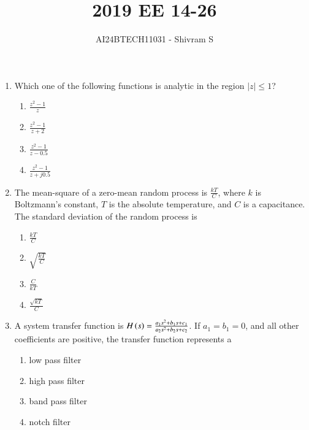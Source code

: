 \documentclass[journal]{IEEEtran}
\begin{document}

\onecolumn

\title{2019 EE 14-26}
\author{AI24BTECH11031 - Shivram S}
\maketitle
\bigskip

\renewcommand{\thefigure}{\theenumi}
\renewcommand{\thetable}{\theenumi}

\begin{enumerate}
    \item Which one of the following functions is analytic in the region $|z| \leq 1$?
    \begin{multicols}{4}
    \begin{enumerate}
        \item $\frac{z^2 - 1}{z}$
        \item $\frac{z^2 - 1}{z + 2}$
        \item $\frac{z^2 - 1}{z - 0.5}$
        \item $\frac{z^2 - 1}{z + j0.5}$
    \end{enumerate}
    \end{multicols}
    
    \item The mean-square of a zero-mean random process is $\frac{kT}{C}$, where $k$
    is Boltzmann’s constant, $T$ is the absolute temperature, and $C$ is a capacitance.
    The standard deviation of the random process is
    \begin{multicols}{4}
    \begin{enumerate}
        \item $\frac{kT}{C}$
        \item $\sqrt{\frac{kT}{C}}$
        \item $\frac{C}{kT}$
        \item $\frac{\sqrt{kT}}{C}$
    \end{enumerate}
    \end{multicols}

    \item A system transfer function is $H\left(s\right) = \frac{a_1 s^2 + b_1 s + c_1}{a_2 s^2 + b_2 s + c_2}$.
    If $a_1 = b_1 = 0$, and all other coefficients are positive, the transfer function represents a
    \begin{enumerate}
        \item low pass filter
        \item high pass filter
        \item band pass filter
        \item notch filter
    \end{enumerate}
    

\end{enumerate}
\end{document}
